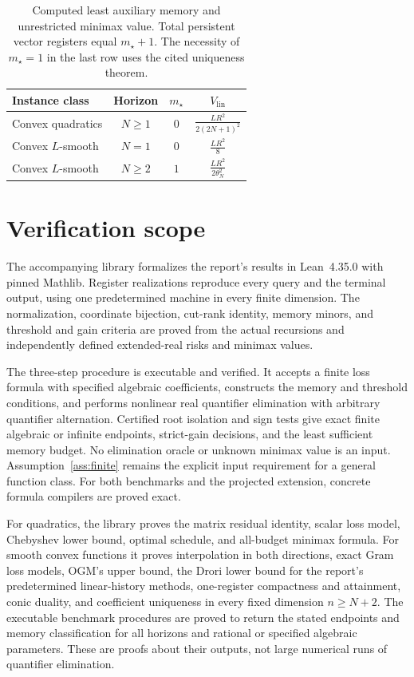 \documentclass[11pt]{article}
\numberwithin{equation}{section}
\theoremstyle{definition}
\begin{document}
\begin{table}[ht]
\centering
\renewcommand{\arraystretch}{1.45}
\begin{tabular}{@{}lccc@{}}
\toprule
Instance class & Horizon & $m_\star$ & $V_{\mathrm{lin}}$\\
\midrule
Convex quadratics & $N\ge1$ & $0$ & $\displaystyle\frac{LR^2}{2(2N+1)^2}$\\
Convex $L$-smooth & $N=1$ & $0$ & $\displaystyle\frac{LR^2}{8}$\\
Convex $L$-smooth & $N\ge2$ & $1$ & $\displaystyle\frac{LR^2}{2\theta_N^2}$\\
\bottomrule
\end{tabular}
\caption{Computed least auxiliary memory and unrestricted minimax value. Total persistent vector registers equal $m_\star+1$. The necessity of $m_\star=1$ in the last row uses the cited uniqueness theorem.}
\label{tab:results}
\end{table}

\FloatBarrier

\section*{Verification scope}
The accompanying library formalizes the report's results in Lean~4.35.0
with pinned Mathlib. Register realizations reproduce every query and the
terminal output, using one predetermined machine in every finite dimension.
The normalization, coordinate bijection, cut-rank identity, memory minors,
and threshold and gain criteria are proved from the actual recursions and
independently defined extended-real risks and minimax values.

The three-step procedure is executable and verified. It accepts a finite
loss formula with specified algebraic coefficients, constructs the memory
and threshold conditions, and performs nonlinear real quantifier elimination
with arbitrary quantifier alternation. Certified root isolation and sign
tests give exact finite algebraic or infinite endpoints, strict-gain decisions,
and the least sufficient memory budget. No elimination oracle or unknown
minimax value is an input. Assumption~\ref{ass:finite} remains the explicit
input requirement for a general function class. For both benchmarks and the
projected extension, concrete formula compilers are proved exact.

For quadratics, the library proves the matrix residual identity, scalar
loss model, Chebyshev lower bound, optimal schedule, and all-budget minimax
formula. For smooth convex functions it proves interpolation in both
directions, exact Gram loss models, OGM's upper bound, the Drori lower bound
for the report's predetermined linear-history methods, one-register
compactness and attainment, conic duality, and coefficient uniqueness in
every fixed dimension $n\ge N+2$. The executable benchmark procedures are
proved to return the stated endpoints and memory classification for all
horizons and rational or specified algebraic parameters. These are proofs
about their outputs, not large numerical runs of quantifier elimination.
\end{document}
